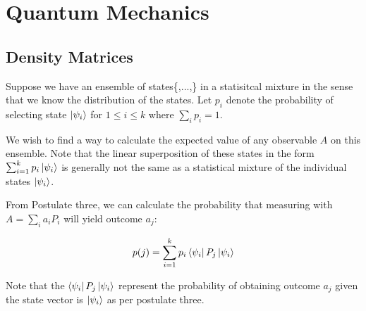 \documentclass{../quantum.tex}
\begin{document}
\section{Quantum Mechanics}

\subsection{Density Matrices}

Suppose we have an ensemble of states\{,...,\} in a statisitcal mixture in the sense that we know the distribution of the states. Let $p_i$ denote the probability of selecting state $\ket{\psi_i}$ for $1 \leq i \leq k$ where $\sum_i p_i = 1$.

We wish to find a way to calculate the expected value of any observable $A$ on this ensemble. Note that the linear superposition of these states in the form $\sum_{i=1}^k p_i \ket{\psi_i}$ is generally not the same as a statistical mixture of the individual states $\ket{\psi_i}$.

From Postulate three, we can calculate the probability that measuring with $A = \sum_i a_iP_i$ will yield outcome $a_j$:

$$ p(j) = \sum_{i=1}^k p_i \bra{\psi_i}P_j\ket{\psi_i} $$

Note that the $\bra{\psi_i}P_j\ket{\psi_i}$ represent the probability of obtaining outcome $a_j$ given the state vector is $\ket{\psi_i}$ as per postulate three.
\end{document}
